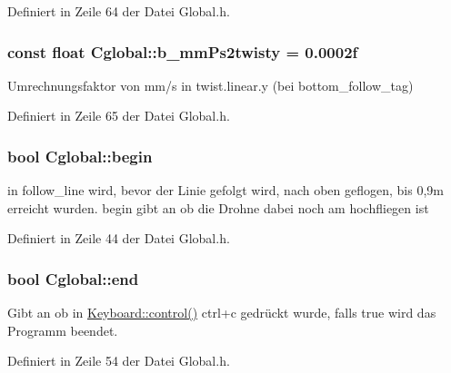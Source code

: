 Definiert in Zeile 64 der Datei Global.h.

\hypertarget{class_cglobal_aa70b2a6e29e8c452aab53cefaf77a01e}{
\subsubsection[{b\_\-mmPs2twisty}]{\setlength{\rightskip}{0pt plus 5cm}const float {\bf Cglobal::b\_\-mmPs2twisty} = 0.0002f}}
\label{class_cglobal_aa70b2a6e29e8c452aab53cefaf77a01e}


Umrechnungsfaktor von mm/s in twist.linear.y (bei bottom\_\-follow\_\-tag) 



Definiert in Zeile 65 der Datei Global.h.

\hypertarget{class_cglobal_a2b9c1321be7adaacc3bed175e49fb02b}{
\subsubsection[{begin}]{\setlength{\rightskip}{0pt plus 5cm}bool {\bf Cglobal::begin}}}
\label{class_cglobal_a2b9c1321be7adaacc3bed175e49fb02b}


in follow\_\-line wird, bevor der Linie gefolgt wird, nach oben geflogen, bis 0,9m erreicht wurden. begin gibt an ob die Drohne dabei noch am hochfliegen ist 



Definiert in Zeile 44 der Datei Global.h.

\hypertarget{class_cglobal_a24fbb5c4b0ddab650375d08ba677b3f1}{
\subsubsection[{end}]{\setlength{\rightskip}{0pt plus 5cm}bool {\bf Cglobal::end}}}
\label{class_cglobal_a24fbb5c4b0ddab650375d08ba677b3f1}


Gibt an ob in \hyperlink{namespace_keyboard_abfb3168172d115a6516147c6d42f58db}{Keyboard::control()} ctrl+c gedrückt wurde, falls true wird das Programm beendet. 



Definiert in Zeile 54 der Datei Global.h.

